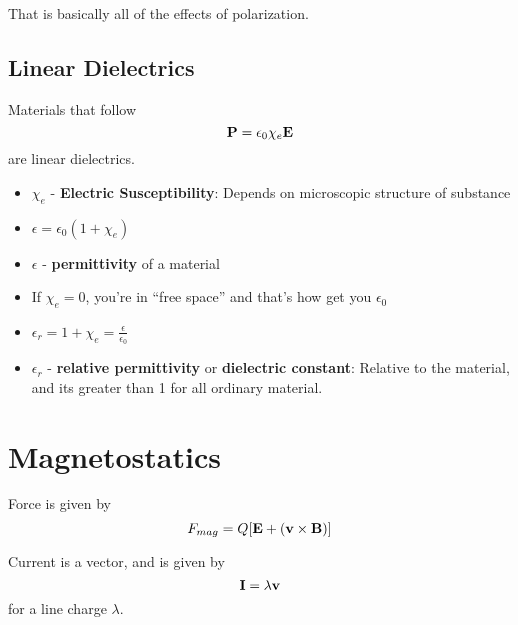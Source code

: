 \documentclass{article}
\begin{document}
That is basically all of the effects of polarization.

\subsection{Linear Dielectrics}
Materials that follow 
$$
\vb{P} = \epsilon_0 \chi_e \vb{E}
$$
are linear dielectrics.

\begin{itemize}
    \item $\chi_e$ - \textbf{Electric Susceptibility}: Depends on microscopic structure of substance
    \item $\epsilon = \epsilon_0(1+\chi_e)$
    \item $\epsilon$ - \textbf{permittivity} of a material
    \item If $\chi_e = 0$, you're in ``free space'' and that's how get you $\epsilon_0$
    \item $\epsilon_r = 1 + \chi_e = \frac{\epsilon}{\epsilon_0}$
    \item $\epsilon_r$ - \textbf{relative permittivity} or \textbf{dielectric constant}: Relative to the material, and its greater than 1 for all ordinary material.
\end{itemize}


\section{Magnetostatics}

Force is given by
$$
F_{mag} = Q[\vb{E} + (\vb{v} \times \vb{B})]
$$

Current is a vector, and is given by
$$
\vb{I} = \lambda \vb{v}
$$
for a line charge $\lambda$.
\end{document}
